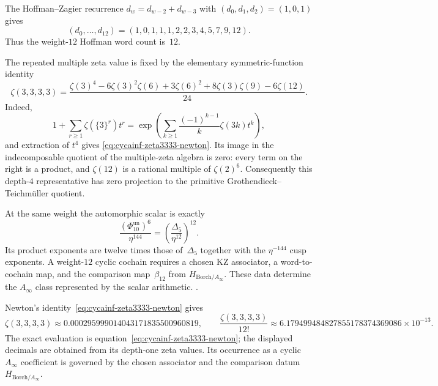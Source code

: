 \begin{remark}
\label{rem:cycainf-depth-4}
The Hoffman--Zagier recurrence
$d_w=d_{w-2}+d_{w-3}$ with
$(d_0,d_1,d_2)=(1,0,1)$ gives
\[
 (d_0,\ldots,d_{12})
 =(1,0,1,1,1,2,2,3,4,5,7,9,12).
\]
Thus the weight-$12$ Hoffman word count is~$12$.

The repeated multiple zeta value is fixed by the elementary
symmetric-function identity
\begin{equation}
\label{eq:cycainf-zeta3333-newton}
 \zeta(3,3,3,3)
 =
 \frac{
 \zeta(3)^4
 -6\zeta(3)^2\zeta(6)
 +3\zeta(6)^2
 +8\zeta(3)\zeta(9)
 -6\zeta(12)}{24}.
\end{equation}
Indeed,
\[
 1+\sum_{r\geq1}\zeta(\{3\}^r)t^r
 =
 \exp\!\left(
 \sum_{k\geq1}\frac{(-1)^{k-1}}{k}\zeta(3k)t^k
 \right),
\]
and extraction of $t^4$ gives
\eqref{eq:cycainf-zeta3333-newton}.  Its image in the
indecomposable quotient of the multiple-zeta algebra is zero: every
term on the right is a product, and $\zeta(12)$ is a rational
multiple of $\zeta(2)^6$.  Consequently this depth-$4$
representative has zero projection to the primitive
Grothendieck--Teichm\"uller quotient.

At the same weight the automorphic scalar is exactly
\begin{equation}
\label{eq:cycainf-weight12-automorphic-scalar}
 \frac{(\Phi_{10}^{\mathrm{un}})^6}{\eta^{144}}
 =
 \left(\frac{\Delta_5}{\eta^{12}}\right)^{\!12}.
\end{equation}
Its product exponents are twelve times those of~$\Delta_5$ together
with the $\eta^{-144}$ cusp exponents.  A weight-$12$ cyclic cochain
requires a chosen KZ associator, a word-to-cochain map, and the
comparison map~$\beta_{12}$ from
$H_{\mathrm{Borch}/A_\infty}$.  These data determine the
$A_\infty$ class represented by the scalar arithmetic.
\cite{Brown2011,Brown2012,GritsenkoNikulin1998}.
\end{remark}

\begin{remark}
\label{rem:cycainf-c12-explicit}
Newton's identity~\eqref{eq:cycainf-zeta3333-newton} gives
\[
 \zeta(3,3,3,3)
 \approx0.000295999014043171835500960819,
 \qquad
 \frac{\zeta(3,3,3,3)}{12!}
 \approx6.179499484827855178374369086\times10^{-13}.
\]
The exact evaluation is equation~\eqref{eq:cycainf-zeta3333-newton};
the displayed decimals are obtained from its depth-one zeta values.
Its occurrence as a cyclic
$A_\infty$ coefficient is governed by the chosen associator and the
comparison datum $H_{\mathrm{Borch}/A_\infty}$.
\end{remark}

